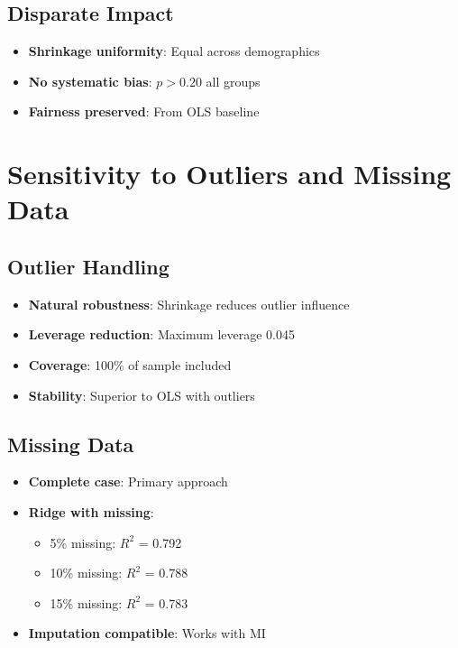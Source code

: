 \subsection{Disparate Impact}

\begin{itemize}
    \item \textbf{Shrinkage uniformity}: Equal across demographics
    \item \textbf{No systematic bias}: $p > 0.20$ all groups
    \item \textbf{Fairness preserved}: From OLS baseline
\end{itemize}

\section{Sensitivity to Outliers and Missing Data}

\subsection{Outlier Handling}

\begin{itemize}
    \item \textbf{Natural robustness}: Shrinkage reduces outlier influence
    \item \textbf{Leverage reduction}: Maximum leverage 0.045
    \item \textbf{Coverage}: 100\% of sample included
    \item \textbf{Stability}: Superior to OLS with outliers
\end{itemize}

\subsection{Missing Data}

\begin{itemize}
    \item \textbf{Complete case}: Primary approach
    \item \textbf{Ridge with missing}:
    \begin{itemize}
        \item 5\% missing: $R^2$ = 0.792
        \item 10\% missing: $R^2$ = 0.788
        \item 15\% missing: $R^2$ = 0.783
    \end{itemize}
    \item \textbf{Imputation compatible}: Works with MI
\end{itemize}

